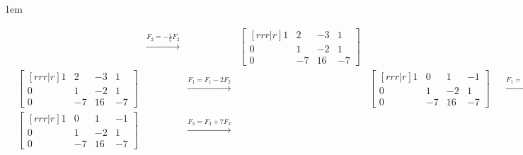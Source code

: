 \documentclass[12pt, fleqn]{report}                             %
\newenvironment{SmallIndentation}[1][0.75em]                    %
        {\begin{adjustwidth}{#1}{}\begin{footnotesize}}             %
        {\end{footnotesize}\end{adjustwidth}}                       %
\theoremstyle{break}                                            %
\newcommand \lLongTo {\longrightarrow}                          %
\begin{document}
\begin{SmallIndentation}[1em]
\begin{align*}
                        &&
                        \overset{F_2 = -\frac{1}{5}F_2}{\lLongTo}
                        &&
                        \begin{bmatrix}[r r r | r]
                            1 &  2 & -3  &  1       \\
                            0 & 1  & -2  & 1        \\
                            0 & -7 & 16  & -7  
                        \end{bmatrix}
                        \\
                        &
                        \begin{bmatrix}[r r r | r]
                            1 &  2 & -3  &  1       \\
                            0 & 1  & -2  & 1        \\
                            0 & -7 & 16  & -7  
                        \end{bmatrix}
                        &&
                        \overset{F_1 = F_1 -2F_2}{\lLongTo}
                        &&
                        \begin{bmatrix}[r r r | r]
                            1 & 0  & 1   & -1       \\
                            0 & 1  & -2  &  1       \\
                            0 & -7 & 16  & -7  
                        \end{bmatrix}
                        &&
                        \overset{F_1 = F_1 -2F_2}{\lLongTo}
                        &&
                        \begin{bmatrix}[r r r | r]
                            1 & 0  & 1   & -1       \\
                            0 & 1  & -2  &  1       \\
                            0 & -7 & 16  & -7  
                        \end{bmatrix}
                        \\
                        &
                        \begin{bmatrix}[r r r | r]
                            1 & 0  & 1   & -1       \\
                            0 & 1  & -2  &  1       \\
                            0 & -7 & 16  & -7  
                        \end{bmatrix}
                        &&
                        \overset{F_3 = F_3 + 7F_2}{\lLongTo}

\end{align*}
\end{SmallIndentation}
\end{document}
